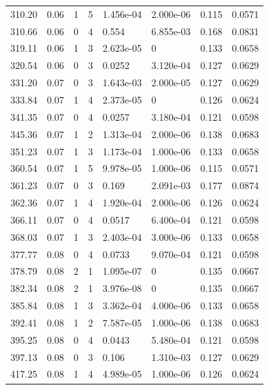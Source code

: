 \documentclass[preview]{standalone}
\begin{document}
{{{\begin{tabular}{L{1.2cm}C{1.2cm} C{0.3cm}C{0.5cm} C{1.4cm}C{1.4cm} C{1.4cm}C{1.4cm}}
  310.20  &  0.06  & 1     &  5 &  1.456e-04  & 2.000e-06  & 0.115 &  0.0571   \\ 
  310.66  &  0.06  & 0     &  4 &  0.554  & 6.855e-03  & 0.168 &  0.0831   \\ 
  319.11  &  0.06  & 1     &  3 &  2.623e-05  & 0  & 0.133 &  0.0658   \\ 
  320.54  &  0.06  & 0     &  3 &  0.0252  & 3.120e-04  & 0.127 &  0.0629   \\ 
  331.20  &  0.07  & 0     &  3 &  1.643e-03  & 2.000e-05  & 0.127 &  0.0629   \\ 
  333.84  &  0.07  & 1     &  4 &  2.373e-05  & 0  & 0.126 &  0.0624   \\ 
  341.35  &  0.07  & 0     &  4 &  0.0257  & 3.180e-04  & 0.121 &  0.0598   \\ 
  345.36  &  0.07  & 1     &  2 &  1.313e-04  & 2.000e-06  & 0.138 &  0.0683   \\ 
  351.23  &  0.07  & 1     &  3 &  1.173e-04  & 1.000e-06  & 0.133 &  0.0658   \\ 
  360.54  &  0.07  & 1     &  5 &  9.978e-05  & 1.000e-06  & 0.115 &  0.0571   \\ 
  361.23  &  0.07  & 0     &  3 &  0.169  & 2.091e-03  & 0.177 &  0.0874   \\ 
  362.36  &  0.07  & 1     &  4 &  1.920e-04  & 2.000e-06  & 0.126 &  0.0624   \\ 
  366.11  &  0.07  & 0     &  4 &  0.0517  & 6.400e-04  & 0.121 &  0.0598   \\ 
  368.03  &  0.07  & 1     &  3 &  2.403e-04  & 3.000e-06  & 0.133 &  0.0658   \\ 
  377.77  &  0.08  & 0     &  4 &  0.0733  & 9.070e-04  & 0.121 &  0.0598   \\ 
  378.79  &  0.08  & 2     &  1 &  1.095e-07  & 0  & 0.135 &  0.0667   \\ 
  382.34  &  0.08  & 2     &  1 &  3.976e-08  & 0  & 0.135 &  0.0667   \\ 
  385.84  &  0.08  & 1     &  3 &  3.362e-04  & 4.000e-06  & 0.133 &  0.0658   \\ 
  392.41  &  0.08  & 1     &  2 &  7.587e-05  & 1.000e-06  & 0.138 &  0.0683   \\ 
  395.25  &  0.08  & 0     &  4 &  0.0443  & 5.480e-04  & 0.121 &  0.0598   \\ 
  397.13  &  0.08  & 0     &  3 &  0.106  & 1.310e-03  & 0.127 &  0.0629   \\ 
  417.25  &  0.08  & 1     &  4 &  4.989e-05  & 1.000e-06  & 0.126 &  0.0624   \\ 

\end{tabular}}}}
\end{document}
